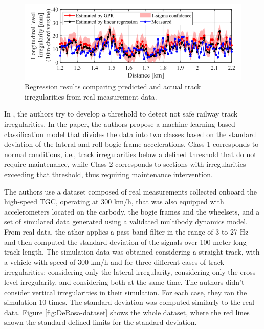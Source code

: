 \begin{figure}[H]
    \centering
    \includegraphics[width=12cm]{Cap2_LitReview/Track_Quality_Accel/Tsunashina (2024)/Results.png}
    \caption{Regression results comparing predicted and actual track irregularities from real measurement data. \cite{vibration7040049}}
    \label{fig:Tsunashina_Results}
\end{figure}

In \cite{DeRosa2021}, the authors try to develop a threshold to detect not safe railway track irregularities. In the paper, the authors propose a machine learning-based classification model that divides the data into two classes based on the standard deviation of the lateral and roll bogie frame accelerations. Class 1 corresponds to normal conditions, i.e., track irregularities below a defined threshold that do not require maintenance, while Class 2 corresponds to sections with irregularities exceeding that threshold, thus requiring maintenance intervention. 

The authors use a dataset composed of real measurements collected onboard the high-speed TGC, operating at 300 km/h, that was also equipped with accelerometers located on the carbody, the bogie frames and the wheelsets, and a set of simulated data generated using a validated multibody dynamics model. From real data, the athor applies a pass-band filter in the range of 3 to 27 Hz and then computed the standard deviation of the signals over 100-meter-long track length. The simulation data was obtained considering a straight track, with a vehicle with speed of 300 km/h and for three different cases of track irregularities: considering only the lateral irregularity, considering only the cross level irregularity, and considering both at the same time. The authors didn't consider vertical irregularities in their simulation. For each case, they ran the simulation 10 times. The standard deviation was computed similarly to the real data. Figure \ref{fig:DeRosa-dataset} shows the whole dataset, where the red lines shown the standard defined limits for the standard deviation.

